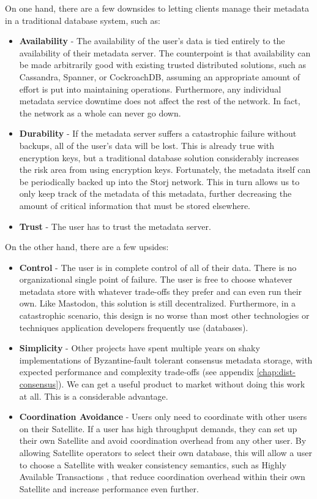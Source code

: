 \documentclass[8pt,fleqn,openany]{book}
\begin{document}
On one hand, there are a few downsides to letting clients manage their metadata in a
traditional database system, such as:
\begin{itemize}
\item {\bf Availability} - The availability of the user's data
is tied entirely to the availability of their metadata server. The counterpoint
is that availability can be made arbitrarily good with existing trusted
distributed solutions, such as Cassandra, Spanner, or CockroachDB, assuming an
appropriate amount of effort is put into maintaining operations. Furthermore, any
individual metadata service downtime does not affect the rest of the network. In
fact, the network as a whole can never go down.
\item {\bf Durability} -
If the metadata server suffers a catastrophic failure without backups, all of
the user's data will be lost. This is already true with encryption keys,
but a traditional database solution considerably increases the risk area from using
encryption keys. Fortunately, the metadata itself can be periodically backed
up into the Storj network. This in turn allows us to only keep track of the
metadata of this metadata, further decreasing the amount of critical information that
must be stored elsewhere.
\item {\bf Trust} - The user has to trust the metadata server.
\end{itemize}

On the other hand, there are a few upsides:
\begin{itemize}
\item {\bf Control} - The user is in complete control of all of their data.
  There is no organizational single point of failure. The user is free
  to choose whatever metadata store with whatever trade-offs they prefer and
  can even run their own. Like
  Mastodon\cite{mastodon}, this solution is still decentralized. Furthermore, in a
  catastrophic scenario, this design is no worse than most other technologies or
  techniques application developers frequently use (databases).
\item {\bf Simplicity} - Other projects have spent multiple years on shaky
  implementations of Byzantine-fault tolerant consensus metadata storage,
  with expected performance and complexity trade-offs
  (see appendix \ref{chap:dist-consensus}).
  We can get a useful product to market without doing this work at all.
  This is a considerable advantage.
\item {\bf Coordination Avoidance} - Users only need to coordinate with
  other users on their Satellite. If a user has high throughput demands,
  they can set up their own Satellite and avoid coordination overhead from
  any other user. By allowing Satellite operators to select their own database,
  this will allow a user to choose a Satellite with weaker consistency
  semantics, such as Highly Available Transactions \cite{hat}, that reduce
  coordination overhead within their own Satellite and increase performance
  even further.
\end{itemize}
\end{document}
